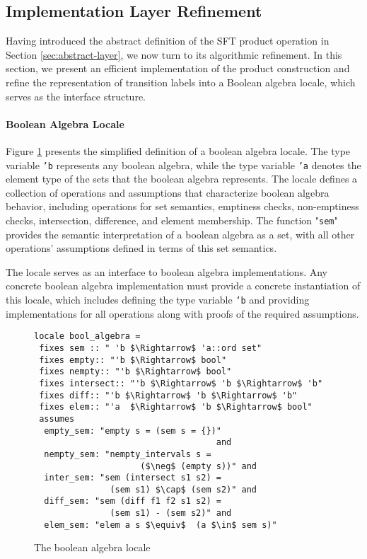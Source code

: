 \subsection{Implementation Layer Refinement}
\label{sec_alg_refinement}
Having introduced the abstract definition of the SFT product operation in Section \ref{sec:abstract-layer}, we now turn to its algorithmic refinement. In this section, we present an efficient implementation of the product construction and refine the representation of transition labels into a Boolean algebra locale, which serves as the interface structure.


\paragraph{Boolean Algebra Locale}

Figure \ref{fig-bool-algebra-locale} presents the simplified definition of a boolean algebra locale. The type variable \texttt{'b} represents any boolean algebra, while the type variable \texttt{'a} denotes the element type of the sets that the boolean algebra represents. The locale defines a collection of operations and assumptions that characterize boolean algebra behavior, including operations for set semantics, emptiness checks, non-emptiness checks, intersection, difference, and element membership. The function "\texttt{sem}" provides the semantic interpretation of a boolean algebra as a set, with all other operations' assumptions defined in terms of this set semantics.

The locale serves as an interface to boolean algebra implementations. Any concrete boolean algebra implementation must provide a concrete instantiation of this locale, which includes defining the type variable \texttt{'b} and providing implementations for all operations along with proofs of the required assumptions.


\begin{figure}[hbt!]
\begin{lstlisting}[mathescape=true]
locale bool_algebra =
 fixes sem :: " 'b $\Rightarrow$ 'a::ord set"
 fixes empty:: "'b $\Rightarrow$ bool"
 fixes nempty:: "'b $\Rightarrow$ bool"
 fixes intersect:: "'b $\Rightarrow$ 'b $\Rightarrow$ 'b"
 fixes diff:: "'b $\Rightarrow$ 'b $\Rightarrow$ 'b"
 fixes elem:: "'a  $\Rightarrow$ 'b $\Rightarrow$ bool"
 assumes
  empty_sem: "empty s = (sem s = {})"
                                    and
  nempty_sem: "nempty_intervals s =
                     ($\neg$ (empty s))" and
  inter_sem: "sem (intersect s1 s2) =
               (sem s1) $\cap$ (sem s2)" and
  diff_sem: "sem (diff f1 f2 s1 s2) =
               (sem s1) - (sem s2)" and
  elem_sem: "elem a s $\equiv$  (a $\in$ sem s)"
\end{lstlisting}
\caption{The boolean algebra locale}
\label{fig-bool-algebra-locale}
\end{figure}




